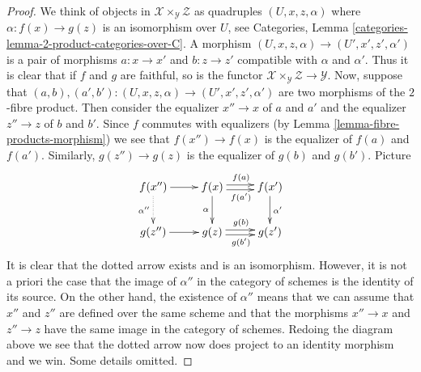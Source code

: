 \documentclass[10pt,a4paper]{amsart}
\theoremstyle{plain}
\theoremstyle{definition}
\theoremstyle{remark}
\numberwithin{equation}{subsection}
\begin{document}
\begin{proof}
We think of objects in $\mathcal{X} \times_\mathcal{Y} \mathcal{Z}$ as
quadruples $(U, x, z, \alpha)$ where $\alpha : f(x) \to g(z)$ is an
isomorphism over $U$, see
Categories, Lemma \ref{categories-lemma-2-product-categories-over-C}.
A morphism $(U, x, z, \alpha) \to (U', x', z', \alpha')$ is a
pair of morphisms $a : x \to x'$ and $b : z \to z'$ compatible
with $\alpha$ and $\alpha'$. Thus it is clear that if $f$ and
$g$ are faithful, so is the functor
$\mathcal{X} \times_\mathcal{Y} \mathcal{Z} \to \mathcal{Y}$.
Now, suppose that
$(a, b), (a', b') : (U, x, z, \alpha) \to (U', x', z', \alpha')$
are two morphisms of the $2$-fibre product. Then consider the equalizer
$x'' \to x$ of $a$ and $a'$ and the equalizer $z'' \to z$ of $b$ and $b'$.
Since $f$ commutes with equalizers (by
Lemma \ref{lemma-fibre-products-morphism})
we see that $f(x'') \to f(x)$ is the equalizer of $f(a)$ and $f(a')$.
Similarly, $g(z'') \to g(z)$ is the equalizer of $g(b)$ and $g(b')$.
Picture
$$
\xymatrix{
f(x'') \ar[r] \ar@{..>}[d]_{\alpha''}&
f(x) \ar[d]_\alpha
\ar@<0.5ex>[r]^{f(a)}
\ar@<-0.5ex>[r]_{f(a')}
 &
f(x') \ar[d]^{\alpha'} \\
g(z'') \ar[r] &
g(z)
\ar@<0.5ex>[r]^{g(b)}
\ar@<-0.5ex>[r]_{g(b')}
 &
g(z')
}
$$
It is clear that the dotted arrow exists and is an isomorphism.
However, it is not a priori the case that the image of $\alpha''$
in the category of schemes is the identity of its source. On the other
hand, the existence of $\alpha''$ means that we can assume that $x''$
and $z''$ are defined over the same scheme and that the morphisms
$x'' \to x$ and $z'' \to z$ have the same image in the category of schemes.
Redoing the diagram above we see that the dotted arrow now does
project to an identity morphism and we win. Some details omitted.
\end{proof}
\end{document}
